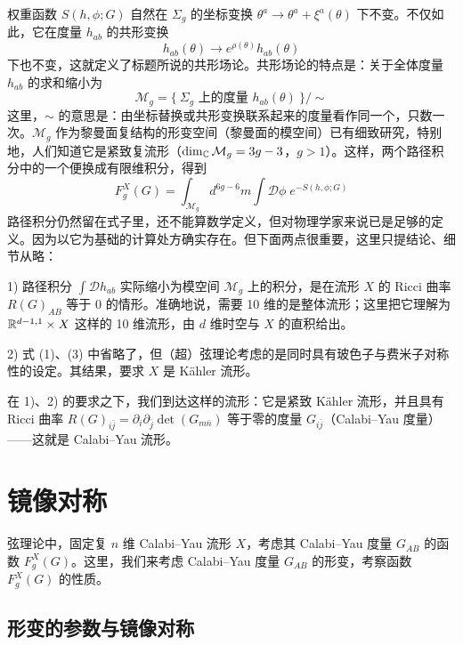 权重函数 $S(h,\phi;G)$ 自然在 $\Sigma_g$ 的坐标变换 $\theta^a\to\theta^a+\xi^a(\theta)$ 下不变。不仅如此，它在度量 $h_{ab}$ 的共形变换
\[
  h_{ab}(\theta)\longrightarrow e^{\rho(\theta)}h_{ab}(\theta)
\]
下也不变，这就定义了标题所说的共形场论。共形场论的特点是：关于全体度量 $h_{ab}$ 的求和缩小为
\[
  \mathcal{M}_g=\{\ \Sigma_g \text{ 上的度量 } h_{ab}(\theta)\ \}/\sim
\]
这里，$\sim$ 的意思是：由坐标替换或共形变换联系起来的度量看作同一个，只数一次。$\mathcal{M}_g$ 作为黎曼面复结构的形变空间（黎曼面的模空间）已有细致研究，特别地，人们知道它是紧致复流形（$\dim_{\mathbb{C}}\mathcal{M}_g=3g-3$，$g>1$）。这样，两个路径积分中的一个便换成有限维积分，得到
\begin{equation}
  F_g^X(G)=\int_{\mathcal{M}_g} d^{6g-6}m\int\mathcal{D}\phi\; e^{-S(h,\phi;G)}
  \tag{3}
\end{equation}
路径积分仍然留在式子里，还不能算数学定义，但对物理学家来说已是足够的定义。因为以它为基础的计算处方确实存在。但下面两点很重要，这里只提结论、细节从略：

1) 路径积分 $\int\mathcal{D}h_{ab}$ 实际缩小为模空间 $\mathcal{M}_g$ 上的积分，是在流形 $X$ 的 Ricci 曲率 $R(G)_{AB}$ 等于 0 的情形。准确地说，需要 10 维的是整体流形；这里把它理解为 $\mathbb{R}^{d-1,1}\times X$ 这样的 10 维流形，由 $d$ 维时空与 $X$ 的直积给出。

2) 式 (1)、(3) 中省略了，但（超）弦理论考虑的是同时具有玻色子与费米子对称性的设定。其结果，要求 $X$ 是 Kähler 流形。

在 1)、2) 的要求之下，我们到达这样的流形：它是紧致 Kähler 流形，并且具有 Ricci 曲率 $R(G)_{i\bar j}=\partial_i\partial_{\bar j}\det(G_{m\bar n})$ 等于零的度量 $G_{i\bar j}$（Calabi--Yau 度量）——这就是 Calabi--Yau 流形。

\section{镜像对称}

弦理论中，固定复 $n$ 维 Calabi--Yau 流形 $X$，考虑其 Calabi--Yau 度量 $G_{AB}$ 的函数 $F_g^X(G)$。这里，我们来考虑 Calabi--Yau 度量 $G_{AB}$ 的形变，考察函数 $F_g^X(G)$ 的性质。

\subsection{形变的参数与镜像对称}

